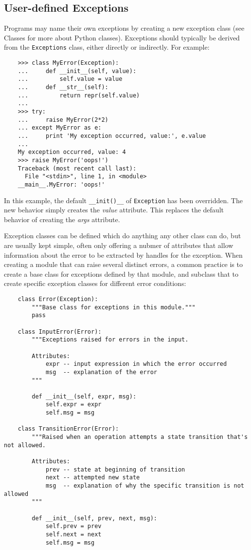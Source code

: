 \documentclass[UTF8]{article}
\begin{document}
\subsection{User-defined Exceptions}
Programs may name their own exceptions by creating a new exception class (see Classes for more
about Python classes). Exceptions should typically be derived from the \texttt{Exceptions} class,
either directly or indirectly. For example:
\begin{verbatim}
    >>> class MyError(Exception):
    ...     def __init__(self, value):
    ...         self.value = value
    ...     def __str__(self):
    ...         return repr(self.value)
    ...
    >>> try:
    ...     raise MyError(2*2)
    ... except MyError as e:
    ...     print 'My exception occurred, value:', e.value
    ...
    My exception occurred, value: 4
    >>> raise MyError('oops!')
    Traceback (most recent call last):
      File "<stdin>", line 1, in <module>
    __main__.MyError: 'oops!'
\end{verbatim}

In this example, the default \texttt{\_\_init()\_\_} of \texttt{Exception} has been overridden.
The new behavior simply creates the \emph{value} attribute. This replaces the default behavior of
creating the \emph{args} attribute.

Exception classes can be defined which do anything any other class can do, but are usually kept
simple, often only offering a nubmer of attributes that allow information about the error to be
extracted by handles for the exception. When creating a module that can raise several distinct
errors, a common practice is to create a base class for exceptions defined by that module, and
subclass that to create specific exception classes for different error conditions:
\begin{verbatim}
    class Error(Exception):
        """Base class for exceptions in this module."""
        pass

    class InputError(Error):
        """Exceptions raised for errors in the input.

        Attributes:
            expr -- input expression in which the error occurred
            msg  -- explanation of the error
        """

        def __init__(self, expr, msg):
            self.expr = expr
            self.msg = msg

    class TransitionError(Error):
        """Raised when an operation attempts a state transition that's not allowed.

        Attributes:
            prev -- state at beginning of transition
            next -- attempted new state
            msg  -- explanation of why the specific transition is not allowed
        """

        def __init__(self, prev, next, msg):
            self.prev = prev
            self.next = next
            self.msg = msg
\end{verbatim}
\end{document}
